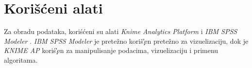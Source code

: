 \section{Kori\v{s}\'c{}eni alati}
\label{sec:Alati}

Za obradu podataka, kori\'s{}\'c{}eni su alati \emph{Knime Analytics Platform} \cite{KNIME} i \emph{IBM SPSS Modeler} \cite{SPSS}. \emph{IBM SPSS Modeler} je prete\v{z}no kori\v{s}\c'{}en prete\v{z}no za vizuelizaciju, dok je \emph{KNIME AP} kori\'s{}\c'{}en za manipulisanje podacima, vizuelizaciju i primenu algoritama.
